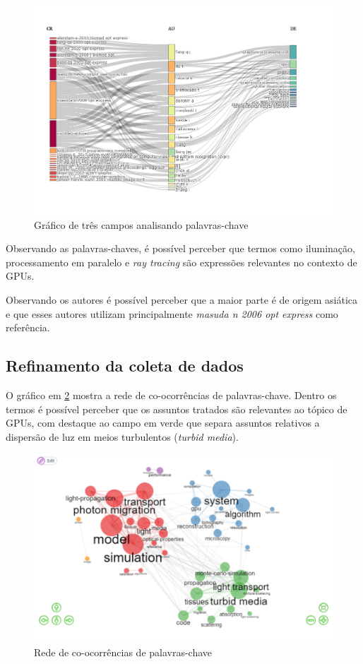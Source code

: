 \begin{figure}[ht]
    \centering
    \includegraphics[width=12cm]{experiments/gustavo-tomas/AnaliseBibliometrica/GPUs/Graficos/gpu-three-field.png}
    \caption{Gráfico de três campos analisando palavras-chave}
    \label{fig:gpu-three-field}
\end{figure}

Observando as palavras-chaves, é possível perceber que termos como iluminação, processamento em paralelo e \textit{ray tracing} são expressões relevantes no contexto de GPUs.

Observando os autores é possível perceber que a maior parte é de origem asiática e que esses autores utilizam principalmente \textit{masuda n 2006 opt express} como referência.

\subsection{Refinamento da coleta de dados}

O gráfico em \ref{fig:gpu-co-occur} mostra a rede de co-ocorrências de palavras-chave. Dentro os termos é possível perceber que os assuntos tratados são relevantes ao tópico de GPUs, com destaque ao campo em verde que separa assuntos relativos a dispersão de luz em meios turbulentos (\textit{turbid media}).

\begin{figure}[ht]
    \includegraphics[width=12cm]{experiments/gustavo-tomas/AnaliseBibliometrica/GPUs/Graficos/gpu-co-ocurr.png}
    \caption{Rede de co-ocorrências de palavras-chave}
    \label{fig:gpu-co-occur}
\end{figure}

